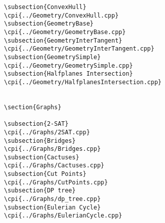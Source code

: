 {\begin{verbatim}
\subsection{ConvexHull}
\cpi{../Geometry/ConvexHull.cpp}
\subsection{GeometryBase}
\cpi{../Geometry/GeometryBase.cpp}
\subsection{GeometryInterTangent}
\cpi{../Geometry/GeometryInterTangent.cpp}
\subsection{GeometrySimple}
\cpi{../Geometry/GeometrySimple.cpp}
\subsection{Halfplanes Intersection}
\cpi{../Geometry/HalfplanesIntersection.cpp}


\section{Graphs}

\subsection{2-SAT}
\cpi{../Graphs/2SAT.cpp}
\subsection{Bridges}
\cpi{../Graphs/Bridges.cpp}
\subsection{Cactuses}
\cpi{../Graphs/Cactuses.cpp}
\subsection{Cut Points}
\cpi{../Graphs/CutPoints.cpp}
\subsection{DP tree}
\cpi{../Graphs/dp_tree.cpp}
\subsection{Eulerian Cycle}
\cpi{../Graphs/EulerianCycle.cpp}

\end{verbatim}}
